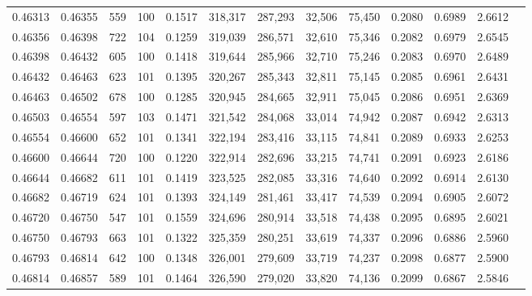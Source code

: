 \begin{tabular}{rrrrrrrrrrrrr}
0.46313 & 0.46355 &   559 & 100 &                                     0.1517 & 318,317 & 287,293 &  32,506 &  75,450 & 0.2080 & 0.6989 & 2.6612 \\
0.46356 & 0.46398 &   722 & 104 &                                     0.1259 & 319,039 & 286,571 &  32,610 &  75,346 & 0.2082 & 0.6979 & 2.6545 \\
0.46398 & 0.46432 &   605 & 100 &                                     0.1418 & 319,644 & 285,966 &  32,710 &  75,246 & 0.2083 & 0.6970 & 2.6489 \\
0.46432 & 0.46463 &   623 & 101 &                                     0.1395 & 320,267 & 285,343 &  32,811 &  75,145 & 0.2085 & 0.6961 & 2.6431 \\
0.46463 & 0.46502 &   678 & 100 &                                     0.1285 & 320,945 & 284,665 &  32,911 &  75,045 & 0.2086 & 0.6951 & 2.6369 \\
0.46503 & 0.46554 &   597 & 103 &                                     0.1471 & 321,542 & 284,068 &  33,014 &  74,942 & 0.2087 & 0.6942 & 2.6313 \\
0.46554 & 0.46600 &   652 & 101 &                                     0.1341 & 322,194 & 283,416 &  33,115 &  74,841 & 0.2089 & 0.6933 & 2.6253 \\
0.46600 & 0.46644 &   720 & 100 &                                     0.1220 & 322,914 & 282,696 &  33,215 &  74,741 & 0.2091 & 0.6923 & 2.6186 \\
0.46644 & 0.46682 &   611 & 101 &                                     0.1419 & 323,525 & 282,085 &  33,316 &  74,640 & 0.2092 & 0.6914 & 2.6130 \\
0.46682 & 0.46719 &   624 & 101 &                                     0.1393 & 324,149 & 281,461 &  33,417 &  74,539 & 0.2094 & 0.6905 & 2.6072 \\
0.46720 & 0.46750 &   547 & 101 &                                     0.1559 & 324,696 & 280,914 &  33,518 &  74,438 & 0.2095 & 0.6895 & 2.6021 \\
0.46750 & 0.46793 &   663 & 101 &                                     0.1322 & 325,359 & 280,251 &  33,619 &  74,337 & 0.2096 & 0.6886 & 2.5960 \\
0.46793 & 0.46814 &   642 & 100 &                                     0.1348 & 326,001 & 279,609 &  33,719 &  74,237 & 0.2098 & 0.6877 & 2.5900 \\
0.46814 & 0.46857 &   589 & 101 &                                     0.1464 & 326,590 & 279,020 &  33,820 &  74,136 & 0.2099 & 0.6867 & 2.5846 \\

\end{tabular}
